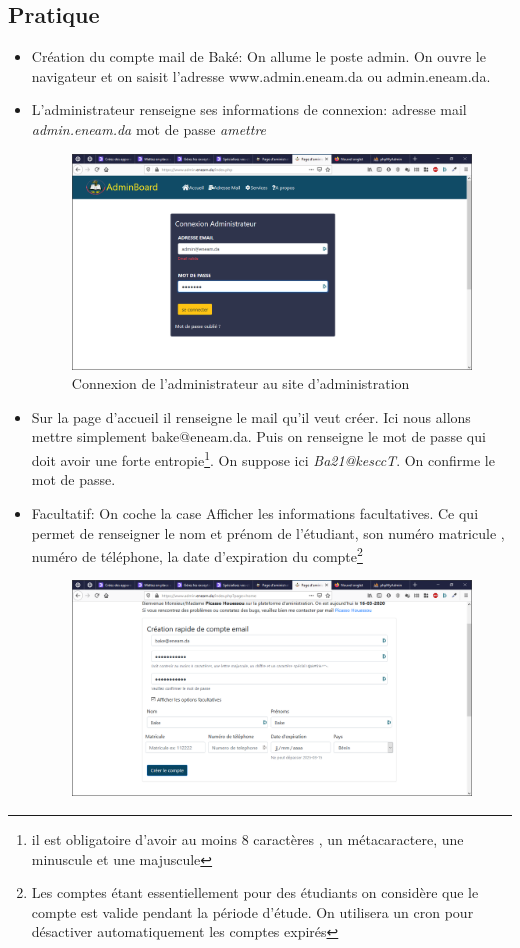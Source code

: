 \documentclass[a4paper,12pt,french]{report} %
\begin{document}
\subsection{Pratique}
\begin{itemize}
\item Création du compte mail de Baké: On allume le poste admin. On ouvre le navigateur et on saisit l'adresse www.admin.eneam.da ou admin.eneam.da.
\item L'administrateur renseigne ses informations de connexion: adresse mail \emph{admin.eneam.da} mot de passe \emph{amettre}
\begin{figure}[H]
\centering
\includegraphics[scale=0.5]{figure/connexion_admin.png}
\caption{Connexion de l'administrateur au site d'administration}
\end{figure}
\item Sur la page d'accueil il renseigne le mail qu'il veut créer. Ici nous allons mettre simplement bake@eneam.da. Puis on renseigne le mot de passe qui doit avoir une forte entropie\footnote{il est obligatoire d'avoir au moins 8 caractères , un métacaractere, une minuscule et une majuscule}. On suppose ici \emph{Ba21@kesccT}. On confirme le mot de passe.
\item Facultatif: On coche la case Afficher les informations facultatives. Ce qui permet de renseigner le nom et prénom de l'étudiant, son numéro matricule , numéro de téléphone, la date d'expiration du compte\footnote{Les comptes étant essentiellement pour des étudiants on considère que le compte est valide pendant la période d'étude. On utilisera un cron pour désactiver automatiquement les comptes expirés}
\begin{figure}[H]
\centering
\includegraphics[scale=0.5]{figure/creation_compte_bake.png} \\[1cm]

\end{figure}
\end{itemize}
\end{document}
